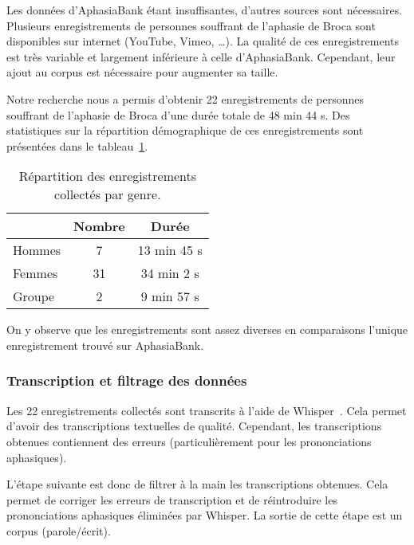 Les données d'AphasiaBank étant insuffisantes, d'autres sources sont nécessaires.
Plusieurs enregistrements de personnes souffrant de l'aphasie de Broca sont disponibles sur internet 
(YouTube, Vimeo, \dots).
La qualité de ces enregistrements est très variable et largement inférieure à celle d'AphasiaBank.
Cependant, leur ajout au corpus est nécessaire pour augmenter sa taille.

Notre recherche nous a permis d'obtenir 22 enregistrements de personnes souffrant de l'aphasie de Broca 
d'une durée totale de 48 min 44 s.
Des statistiques sur la répartition démographique de ces enregistrements 
sont présentées dans le tableau~\ref{tab.asr-data-demographics}.
\begin{table}[hbt]
    \begin{center}
        \begin{tabular}{|l|c|c|}
            \cline{2-3}
            \multicolumn{1}{c|}{}& \textbf{Nombre}& \textbf{Durée}\\
            \hline
            Hommes               & 7              & 13 min 45 s   \\
            \hline
            Femmes               & 31             & 34 min 2 s    \\
            \hline
            Groupe               & 2              & 9 min 57 s    \\
            \hline
        \end{tabular}
    \end{center}
    \caption{Répartition des enregistrements collectés par genre.}
    \label{tab.asr-data-demographics}
\end{table}
On y observe que les enregistrements sont assez diverses en comparaisons l'unique enregistrement trouvé sur AphasiaBank.

\subsubsection{Transcription et filtrage des données}

Les 22 enregistrements collectés sont transcrits à l'aide de 
Whisper~\cite{Radford_Kim_Xu_Brockman_McLeavey_Sutskever_2022}.
Cela permet d'avoir des transcriptions textuelles de qualité.
Cependant, les transcriptions obtenues contiennent des erreurs (particulièrement pour les prononciations aphasiques).

L'étape suivante est donc de filtrer à la main les transcriptions obtenues.
Cela permet de corriger les erreurs de transcription 
et de réintroduire les prononciations aphasiques éliminées par Whisper.
La sortie de cette étape est un corpus (parole/écrit).

